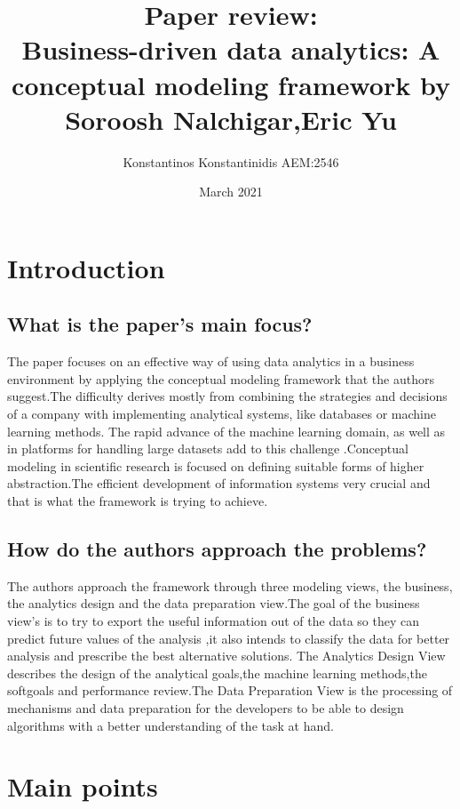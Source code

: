 \documentclass{article}
\title{Paper review:\\Business-driven data analytics: A conceptual modeling framework by Soroosh Nalchigar,Eric Yu}
\author{Konstantinos Konstantinidis AEM:2546}
\date{March 2021}
\begin{document}
\maketitle

\section{Introduction}
\subsection{What is the paper's main focus?}
The paper focuses on an effective way of using data analytics in a business environment by applying the conceptual modeling framework that the authors suggest.The difficulty derives mostly from combining the strategies and decisions of a company with implementing analytical systems, like databases or machine learning methods. The rapid advance of the machine learning domain, as well as in platforms for handling large datasets add to this challenge .Conceptual modeling in scientific research is focused on defining suitable forms of higher abstraction.The efficient development of information systems very crucial and that is what the framework is trying to achieve. 
\subsection{How do the authors approach the problems?}
The authors approach the framework through three modeling views, the business, the analytics design and the data preparation view.The goal of the business view's is to try to export the useful information out of the data so they can predict future values of the analysis ,it also intends to classify the data for better analysis and prescribe the best alternative solutions. The Analytics Design View describes the design of the analytical goals,the machine learning methods,the softgoals and performance review.The Data Preparation View is the processing of mechanisms and data preparation for the developers to be able to design algorithms with a better understanding of the task at hand.

\section{Main points}
\end{document}
